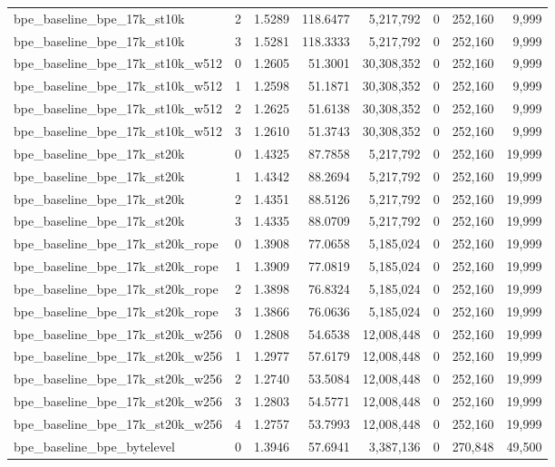\begin{tabular}{lrrrrrrr}
bpe\_baseline\_bpe\_17k\_st10k & 2 & 1.5289 & 118.6477 & 5,217,792 & 0 & 252,160 & 9,999 \\
bpe\_baseline\_bpe\_17k\_st10k & 3 & 1.5281 & 118.3333 & 5,217,792 & 0 & 252,160 & 9,999 \\
bpe\_baseline\_bpe\_17k\_st10k\_w512 & 0 & 1.2605 & 51.3001 & 30,308,352 & 0 & 252,160 & 9,999 \\
bpe\_baseline\_bpe\_17k\_st10k\_w512 & 1 & 1.2598 & 51.1871 & 30,308,352 & 0 & 252,160 & 9,999 \\
bpe\_baseline\_bpe\_17k\_st10k\_w512 & 2 & 1.2625 & 51.6138 & 30,308,352 & 0 & 252,160 & 9,999 \\
bpe\_baseline\_bpe\_17k\_st10k\_w512 & 3 & 1.2610 & 51.3743 & 30,308,352 & 0 & 252,160 & 9,999 \\
bpe\_baseline\_bpe\_17k\_st20k & 0 & 1.4325 & 87.7858 & 5,217,792 & 0 & 252,160 & 19,999 \\
bpe\_baseline\_bpe\_17k\_st20k & 1 & 1.4342 & 88.2694 & 5,217,792 & 0 & 252,160 & 19,999 \\
bpe\_baseline\_bpe\_17k\_st20k & 2 & 1.4351 & 88.5126 & 5,217,792 & 0 & 252,160 & 19,999 \\
bpe\_baseline\_bpe\_17k\_st20k & 3 & 1.4335 & 88.0709 & 5,217,792 & 0 & 252,160 & 19,999 \\
bpe\_baseline\_bpe\_17k\_st20k\_rope & 0 & 1.3908 & 77.0658 & 5,185,024 & 0 & 252,160 & 19,999 \\
bpe\_baseline\_bpe\_17k\_st20k\_rope & 1 & 1.3909 & 77.0819 & 5,185,024 & 0 & 252,160 & 19,999 \\
bpe\_baseline\_bpe\_17k\_st20k\_rope & 2 & 1.3898 & 76.8324 & 5,185,024 & 0 & 252,160 & 19,999 \\
bpe\_baseline\_bpe\_17k\_st20k\_rope & 3 & 1.3866 & 76.0636 & 5,185,024 & 0 & 252,160 & 19,999 \\
bpe\_baseline\_bpe\_17k\_st20k\_w256 & 0 & 1.2808 & 54.6538 & 12,008,448 & 0 & 252,160 & 19,999 \\
bpe\_baseline\_bpe\_17k\_st20k\_w256 & 1 & 1.2977 & 57.6179 & 12,008,448 & 0 & 252,160 & 19,999 \\
bpe\_baseline\_bpe\_17k\_st20k\_w256 & 2 & 1.2740 & 53.5084 & 12,008,448 & 0 & 252,160 & 19,999 \\
bpe\_baseline\_bpe\_17k\_st20k\_w256 & 3 & 1.2803 & 54.5771 & 12,008,448 & 0 & 252,160 & 19,999 \\
bpe\_baseline\_bpe\_17k\_st20k\_w256 & 4 & 1.2757 & 53.7993 & 12,008,448 & 0 & 252,160 & 19,999 \\
bpe\_baseline\_bpe\_bytelevel & 0 & 1.3946 & 57.6941 & 3,387,136 & 0 & 270,848 & 49,500 \\

\end{tabular}
